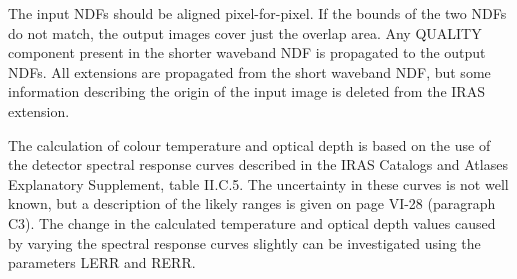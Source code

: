 \documentclass[11pt,nolof,noabs]{starlink}
\begin{document}
\begin{small}
{{      The input NDFs should be aligned pixel-for-pixel. If the bounds
      of the two NDFs do not match, the output images cover just the
      overlap area. Any QUALITY component present in the shorter
      waveband NDF is propagated to the output NDFs. All extensions are
      propagated from the short waveband NDF, but some information
      describing the origin of the input image is deleted from the
      IRAS extension.

      The calculation of colour temperature and optical depth is based
      on the use of the detector spectral response curves described in
      the IRAS Catalogs and Atlases Explanatory Supplement, table
      II.C.5. The uncertainty in these curves is not well known, but a
      description of the likely ranges is given on page VI-28
      (paragraph C3). The change in the calculated temperature and
      optical depth values caused by varying the spectral response
      curves slightly can be investigated using the parameters LERR and
      RERR.

}}
\end{small}
\end{document}
